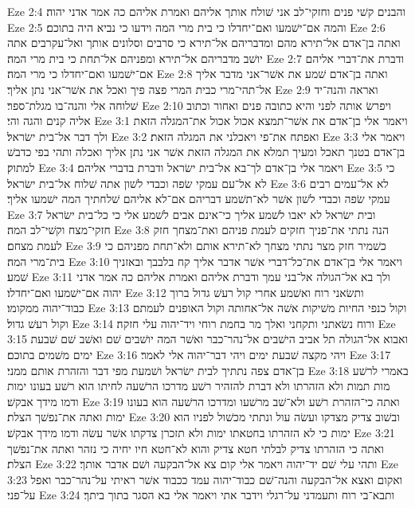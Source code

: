 Eze 2:4  והבנים קשׁי פנים וחזקי־לב אני שׁולח אותך אליהם ואמרת אליהם כה אמר אדני יהוה׃
Eze 2:5  והמה אם־ישׁמעו ואם־יחדלו כי בית מרי המה וידעו כי נביא היה בתוכם׃
Eze 2:6  ואתה בן־אדם אל־תירא מהם ומדבריהם אל־תירא כי סרבים וסלונים אותך ואל־עקרבים אתה יושׁב מדבריהם אל־תירא ומפניהם אל־תחת כי בית מרי המה׃
Eze 2:7  ודברת את־דברי אליהם אם־ישׁמעו ואם־יחדלו כי מרי המה׃
Eze 2:8  ואתה בן־אדם שׁמע את אשׁר־אני מדבר אליך אל־תהי־מרי כבית המרי פצה פיך ואכל את אשׁר־אני נתן אליך׃
Eze 2:9  ואראה והנה־יד שׁלוחה אלי והנה־בו מגלת־ספר׃
Eze 2:10  ויפרשׂ אותה לפני והיא כתובה פנים ואחור וכתוב אליה קנים והגה והי׃
Eze 3:1  ויאמר אלי בן־אדם את אשׁר־תמצא אכול אכול את־המגלה הזאת ולך דבר אל־בית ישׂראל׃
Eze 3:2  ואפתח את־פי ויאכלני את המגלה הזאת׃
Eze 3:3  ויאמר אלי בן־אדם בטנך תאכל ומעיך תמלא את המגלה הזאת אשׁר אני נתן אליך ואכלה ותהי בפי כדבשׁ למתוק׃
Eze 3:4  ויאמר אלי בן־אדם לך־בא אל־בית ישׂראל ודברת בדברי אליהם׃
Eze 3:5  כי לא אל־עם עמקי שׂפה וכבדי לשׁון אתה שׁלוח אל־בית ישׂראל׃
Eze 3:6  לא אל־עמים רבים עמקי שׂפה וכבדי לשׁון אשׁר לא־תשׁמע דבריהם אם־לא אליהם שׁלחתיך המה ישׁמעו אליך׃
Eze 3:7  ובית ישׂראל לא יאבו לשׁמע אליך כי־אינם אבים לשׁמע אלי כי כל־בית ישׂראל חזקי־מצח וקשׁי־לב המה׃
Eze 3:8  הנה נתתי את־פניך חזקים לעמת פניהם ואת־מצחך חזק לעמת מצחם׃
Eze 3:9  כשׁמיר חזק מצר נתתי מצחך לא־תירא אותם ולא־תחת מפניהם כי בית־מרי המה׃
Eze 3:10  ויאמר אלי בן־אדם את־כל־דברי אשׁר אדבר אליך קח בלבבך ובאזניך שׁמע׃
Eze 3:11  ולך בא אל־הגולה אל־בני עמך ודברת אליהם ואמרת אליהם כה אמר אדני יהוה אם־ישׁמעו ואם־יחדלו׃
Eze 3:12  ותשׂאני רוח ואשׁמע אחרי קול רעשׁ גדול ברוך כבוד־יהוה ממקומו׃
Eze 3:13  וקול כנפי החיות משׁיקות אשׁה אל־אחותה וקול האופנים לעמתם וקול רעשׁ גדול׃
Eze 3:14  ורוח נשׂאתני ותקחני ואלך מר בחמת רוחי ויד־יהוה עלי חזקה׃
Eze 3:15  ואבוא אל־הגולה תל אביב הישׁבים אל־נהר־כבר ואשׁר המה יושׁבים שׁם ואשׁב שׁם שׁבעת ימים משׁמים בתוכם׃
Eze 3:16  ויהי מקצה שׁבעת ימים ויהי דבר־יהוה אלי לאמר׃
Eze 3:17  בן־אדם צפה נתתיך לבית ישׂראל ושׁמעת מפי דבר והזהרת אותם ממני׃
Eze 3:18  באמרי לרשׁע מות תמות ולא הזהרתו ולא דברת להזהיר רשׁע מדרכו הרשׁעה לחיתו הוא רשׁע בעונו ימות ודמו מידך אבקשׁ׃
Eze 3:19  ואתה כי־הזהרת רשׁע ולא־שׁב מרשׁעו ומדרכו הרשׁעה הוא בעונו ימות ואתה את־נפשׁך הצלת׃
Eze 3:20  ובשׁוב צדיק מצדקו ועשׂה עול ונתתי מכשׁול לפניו הוא ימות כי לא הזהרתו בחטאתו ימות ולא תזכרן צדקתו אשׁר עשׂה ודמו מידך אבקשׁ׃
Eze 3:21  ואתה כי הזהרתו צדיק לבלתי חטא צדיק והוא לא־חטא חיו יחיה כי נזהר ואתה את־נפשׁך הצלת׃
Eze 3:22  ותהי עלי שׁם יד־יהוה ויאמר אלי קום צא אל־הבקעה ושׁם אדבר אותך׃
Eze 3:23  ואקום ואצא אל־הבקעה והנה־שׁם כבוד־יהוה עמד ככבוד אשׁר ראיתי על־נהר־כבר ואפל על־פני׃
Eze 3:24  ותבא־בי רוח ותעמדני על־רגלי וידבר אתי ויאמר אלי בא הסגר בתוך ביתך׃

